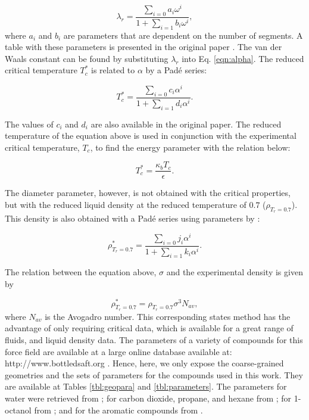 \begin{equation}
\lambda_{r} = \frac{\sum_{i=0} a_{i}\omega^{i}}{1+\sum_{i=1} b_{i}\omega^{i}} ,  
\label{eqn:lambdaco}
\end{equation}
where $a_{i}$ and $b_{i}$ are parameters that are dependent on the number of segments. A table with these parameters is presented in the original paper \cite{mejia2014}. The van der Waals constant can be found by substituting $\lambda_{r}$ into Eq. \eqref{eqn:alpha}. The reduced critical temperature $T_{c}^{*}$ is related to $\alpha$ by a Padé series: 

\begin{equation}
T_{c}^{*} = \frac{\sum_{i=0} c_{i}\alpha^{i}}{1+\sum_{i=1} d_{i}\alpha^{i}}   .
\label{eqn:tc}
\end{equation}

The values of $c_{i}$ and $d_{i}$ are also available in the original paper. The reduced temperature of the equation above is used in conjunction with the experimental critical temperature, $ T_{c}$, to find the energy parameter with the relation below:

\begin{equation}
T_{c}^{*} = \frac{\kappa_{b}T_{c}}{\epsilon}   .
\label{eqn:epscorre}
\end{equation}

The diameter parameter, however, is not obtained with the critical properties, but with the reduced liquid density at the reduced temperature of $0.7$ ($\rho_{T_{r}=0.7}$). This density is also obtained with a Padé series using parameters by :

\begin{equation}
\rho_{T_{r}=0.7}^{*} = \frac{\sum_{i=0} j_{i}\alpha^{i}}{1+\sum_{i=1} k_{i}\alpha^{i}} .
\label{eqn:denscorre}
\end{equation}

The relation between the equation above, $\sigma$ and the experimental density is given by

\begin{equation}
\rho_{T_{r}=0.7}^{*} = \rho_{T_{r}=0.7}\sigma^{3}N_{av},   
\label{eqn:sigmacorre}
\end{equation}
where $N_{av}$ is the Avogadro number. This corresponding states method has the advantage of only requiring critical data, which is available for a great range of fluids, and liquid density data. The parameters of a variety of compounds for this force field are available at a large online database available at: http://www.bottledsaft.org \cite{ervik2016}. Hence, here, we only expose the coarse-grained geometries and the sets of parameters for the compounds used in this work. They are available  at Tables \ref{tbl:geopara} and \ref{tbl:parameters}. The parameters for water were retrieved from ; for carbon dioxide, propane, and hexane from ; for 1-octanol from ; and for the aromatic compounds from   .     

